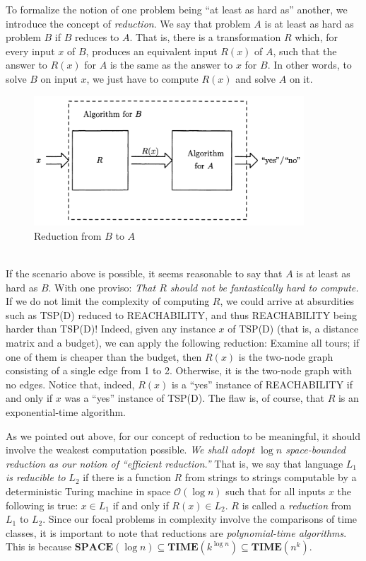 \documentclass[12pt]{article}
\begin{document}
To formalize the notion of one problem being ``at least as hard as'' another, we introduce the concept of \emph{reduction}. We say that problem $A$ is at least as hard as problem $B$ if $B$ reduces to $A$. That is, there is a transformation $R$ which, for every input $x$ of $B$, produces an equivalent input $R(x)$ of $A$, such that the answer to $R(x)$ for $A$ is the same as the answer to $x$ for $B$. In other words, to solve $B$ on input $x$, we just have to compute $R(x)$ and solve $A$ on it.
\begin{figure}[h]
  \centering
  \includegraphics[width=0.9\textwidth]{img/reduction.png}
  \caption{Reduction from $B$ to $A$}
\end{figure}
\\
If the scenario above is possible, it seems reasonable to say that $A$ is at least as hard as $B$. With one proviso: \textit{That $R$ should not be fantastically hard to compute.} If we do not limit the complexity of computing $R$, we could arrive at absurdities such as \textsc{TSP(D)} reduced to \textsc{REACHABILITY}, and thus \textsc{REACHABILITY} being harder than \textsc{TSP(D)}! Indeed, given any instance $x$ of \textsc{TSP(D)} (that is, a distance matrix and a budget), we can apply the following reduction: Examine all tours; if one of them is cheaper than the budget, then $R(x)$ is the two-node graph consisting of a single edge from 1 to 2. Otherwise, it is the two-node graph with no edges. Notice that, indeed, $R(x)$ is a ``yes'' instance of \textsc{REACHABILITY} if and only if $x$ was a ``yes'' instance of \textsc{TSP(D)}. The flaw is, of course, that $R$ is an exponential-time algorithm.
\begin{defbox}[Reduction]
  As we pointed out above, for our concept of reduction to be meaningful, it should involve the weakest computation possible. \emph{We shall adopt $\log n$ space-bounded reduction as our notion of ``efficient reduction.''} That is, we say that language $L_1$ \emph{is reducible to} $L_2$ if there is a function $R$ from strings to strings computable by a deterministic Turing machine in space $\mathcal{O}(\log n)$ such that for all inputs $x$ the following is true: $x \in L_1$ if and only if $R(x) \in L_2$. $R$ is called a \emph{reduction} from $L_1$ to $L_2$. Since our focal problems in complexity involve the comparisons of time classes, it is important to note that reductions are \emph{polynomial-time algorithms}.
  This is because $\textbf{SPACE}(\log n)\subseteq\textbf{TIME}(k^{\log n})\subseteq\textbf{TIME}(n^k)$.
\end{defbox}
\end{document}
